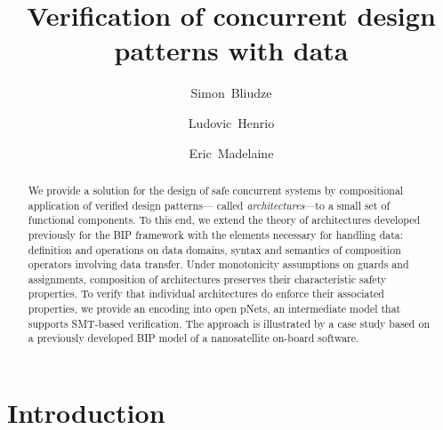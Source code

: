 \documentclass{llncs}
\newcommand{\Eric}{\\\hfill\mdash Eric}
\newcommand{\noteEM}[2][color=blue!40, size=\tiny]{\todo[#1]{{#2}\Eric}}
\newcommand{\mdash}[1][]{---#1}
\begin{document}
\graphicspath{{figures/}}

\title{Verification of concurrent design patterns with data}

\author{%
Simon~Bliudze
\and
Ludovic~Henrio
\and
Eric~Madelaine
}



\maketitle

\begin{abstract}
We provide a solution for the design of safe concurrent systems by
compositional application of verified design patterns\mdash 
called \emph{architectures}\mdash to a small set of functional
components.  To this end, we extend the theory of architectures
developed previously for the BIP framework with the elements necessary
for handling data: definition and operations on data domains, syntax
and semantics of composition operators involving data transfer.  Under
monotonicity assumptions on guards and assignments, composition of
architectures preserves their characteristic safety properties.
To verify that individual architectures do enforce their associated
properties, we provide an encoding into open pNets, an intermediate
model  that supports SMT-based verification.
The approach is illustrated by a case
study based on a previously developed BIP model of a nanosatellite
on-board software.

\end{abstract}


\section{Introduction}
\label{secn:introduction}
\end{document}
